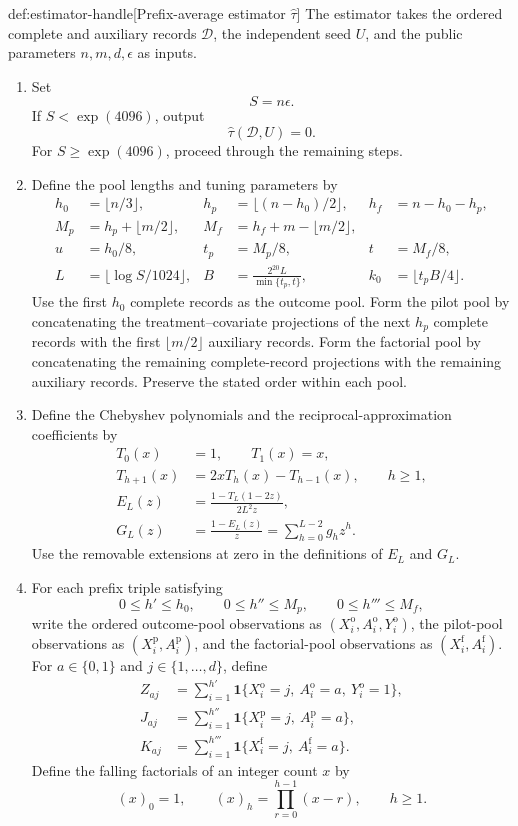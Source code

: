 \begin{algorithmv}{def:estimator-handle}[Prefix-average estimator $\widehat\tau$]
The estimator takes the ordered complete and auxiliary records \(\mathcal D\), the independent seed \(U\), and the public parameters \(n,m,d,\epsilon\) as inputs.
\begin{enumerate}
\item Set
\[
S=n\epsilon.
\]
If \(S<\exp(4096)\), output
\[
\widehat\tau(\mathcal D,U)=0.
\]
For \(S\ge\exp(4096)\), proceed through the remaining steps.

\item Define the pool lengths and tuning parameters by
\[
\begin{aligned}
h_0&=\lfloor n/3\rfloor,
&
h_p&=\lfloor(n-h_0)/2\rfloor,
&
h_f&=n-h_0-h_p,\\
M_p&=h_p+\lfloor m/2\rfloor,
&
M_f&=h_f+m-\lfloor m/2\rfloor,\\
u&=h_0/8,
&
t_p&=M_p/8,
&
t&=M_f/8,\\
L&=\lfloor\log S/1024\rfloor,
&
B&=\frac{2^{20}L}{\min\{t_p,t\}},
&
k_0&=\lfloor t_pB/4\rfloor.
\end{aligned}
\]
Use the first \(h_0\) complete records as the outcome pool. Form the pilot pool by concatenating the treatment--covariate projections of the next \(h_p\) complete records with the first \(\lfloor m/2\rfloor\) auxiliary records. Form the factorial pool by concatenating the remaining complete-record projections with the remaining auxiliary records. Preserve the stated order within each pool.

\item Define the Chebyshev polynomials and the reciprocal-approximation coefficients by
\[
\begin{aligned}
T_0(x)&=1,\qquad T_1(x)=x,\\
T_{h+1}(x)&=2xT_h(x)-T_{h-1}(x),\qquad h\ge1,\\
E_L(z)&=\frac{1-T_L(1-2z)}{2L^2z},\\
G_L(z)&=\frac{1-E_L(z)}z
=\sum_{h=0}^{L-2}g_hz^h.
\end{aligned}
\]
Use the removable extensions at zero in the definitions of \(E_L\) and \(G_L\).

\item For each prefix triple satisfying
\[
0\le h'\le h_0,\qquad
0\le h''\le M_p,\qquad
0\le h'''\le M_f,
\]
write the ordered outcome-pool observations as
\((X_i^{\mathrm o},A_i^{\mathrm o},Y_i^{\mathrm o})\), the pilot-pool observations as
\((X_i^{\mathrm p},A_i^{\mathrm p})\), and the factorial-pool observations as
\((X_i^{\mathrm f},A_i^{\mathrm f})\). For \(a\in\{0,1\}\) and \(j\in\{1,\ldots,d\}\), define
\[
\begin{aligned}
Z_{aj}
&=\sum_{i=1}^{h'}
\mathbf1\{X_i^{\mathrm o}=j,\ A_i^{\mathrm o}=a,\ Y_i^{\mathrm o}=1\},\\
J_{aj}
&=\sum_{i=1}^{h''}
\mathbf1\{X_i^{\mathrm p}=j,\ A_i^{\mathrm p}=a\},\\
K_{aj}
&=\sum_{i=1}^{h'''}
\mathbf1\{X_i^{\mathrm f}=j,\ A_i^{\mathrm f}=a\}.
\end{aligned}
\]
Define the falling factorials of an integer count \(x\) by
\[
(x)_0=1,\qquad
(x)_h=\prod_{r=0}^{h-1}(x-r),\qquad h\ge1.
\]


\end{enumerate}
\end{algorithmv}

